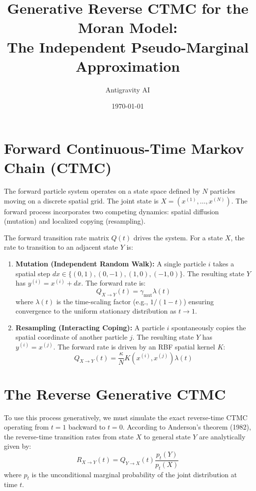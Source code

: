 \documentclass[11pt]{article}
\title{Generative Reverse CTMC for the Moran Model:\\The Independent Pseudo-Marginal Approximation}
\author{Antigravity AI}
\date{\today}
\begin{document}
\maketitle

\section{Forward Continuous-Time Markov Chain (CTMC)}

The forward particle system operates on a state space defined by $N$ particles moving on a discrete spatial grid. The joint state is $X = (x^{(1)}, \ldots, x^{(N)})$. The forward process incorporates two competing dynamics: spatial diffusion (mutation) and localized copying (resampling).

The forward transition rate matrix $Q(t)$ drives the system. For a state $X$, the rate to transition to an adjacent state $Y$ is:

\begin{enumerate}
    \item \textbf{Mutation (Independent Random Walk):} A single particle $i$ takes a spatial step $dx \in \{(0,1), (0,-1), (1,0), (-1,0)\}$. The resulting state $Y$ has $y^{(i)} = x^{(i)} + dx$. The forward rate is:
    \[
        Q_{X \to Y}(t) = \gamma_{\text{mut}} \lambda(t)
    \]
    where $\lambda(t)$ is the time-scaling factor (e.g., $1/(1-t)$) ensuring convergence to the uniform stationary distribution as $t \to 1$.

    \item \textbf{Resampling (Interacting Coping):} A particle $i$ spontaneously copies the spatial coordinate of another particle $j$. The resulting state $Y$ has $y^{(i)} = x^{(j)}$. The forward rate is driven by an RBF spatial kernel $K$:
    \[
        Q_{X \to Y}(t) = \frac{\kappa}{N} K(x^{(i)}, x^{(j)}) \lambda(t)
    \]
\end{enumerate}

\section{The Reverse Generative CTMC}

To use this process generatively, we must simulate the exact reverse-time CTMC operating from $t=1$ backward to $t=0$. According to Anderson's theorem (1982), the reverse-time transition rates from state $X$ to general state $Y$ are analytically given by:
\[
    R_{X \to Y}(t) = Q_{Y \to X}(t) \frac{p_t(Y)}{p_t(X)}
\]
where $p_t$ is the unconditional marginal probability of the joint distribution at time $t$. 
\end{document}
